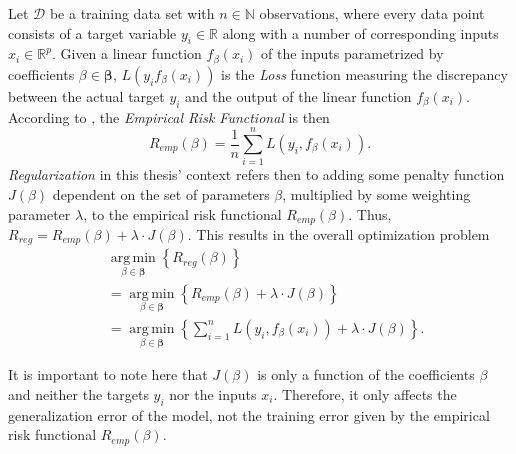 \documentclass[12pt,a4paper]{article}
\DeclareMathOperator*{\argmin}{arg\,min}
\begin{document}
Let $\mathcal{D}$ be a training data set with $n \in \mathbb{N}$ observations, where every data point consists of a target variable $y_i \in \mathbb{R}$ along with a number of corresponding inputs $x_i \in \mathbb{R}^p$. Given a linear function $f_\beta(x_i)$ of the inputs parametrized by coefficients $\beta \in \boldsymbol{\beta}$, $L(y_i f_\beta(x_i))$ is the \textit{Loss} function measuring the discrepancy between the actual target $y_i$ and the output of the linear function $f_\beta(x_i)$. According to \textcite{Vapnik1991}, the \textit{Empirical Risk Functional} is then 
\[
R_{emp}(\beta) = \frac{1}{n} \sum_{i=1}^n L(y_i, f_\beta(x_i)).
\]
\textit{Regularization} in this thesis' context refers then to adding some penalty function $J(\beta)$ dependent on the set of parameters $\beta$, multiplied by some weighting parameter $\lambda$, to the empirical risk functional $R_{emp}(\beta)$. Thus, $R_{reg} = R_{emp}(\beta) + \lambda\cdot J(\beta)$. This results in the overall optimization problem
\begin{align}
&\underset{\beta \in \boldsymbol{\beta}}{\argmin}\left\{R_{reg}(\beta)\right\}\nonumber\\
&=\underset{\beta \in \boldsymbol{\beta}}{\argmin}\left\{R_{emp}(\beta) + \lambda\cdot J(\beta)\right\}\nonumber\\
&=\underset{\beta \in \boldsymbol{\beta}}{\argmin}\left\{\sum_{i=1}^n L(y_i, f_\beta(x_i)) + \lambda\cdot J(\beta)\right\}.\label{eq:genreg}
\end{align}

It is important to note here that $J(\beta)$ is only a function of the coefficients $\beta$ and neither the targets $y_i$ nor the inputs $x_i$. Therefore, it only affects the generalization error of the model, not the training error given by the empirical risk functional $R_{emp}(\beta)$.
\end{document}
